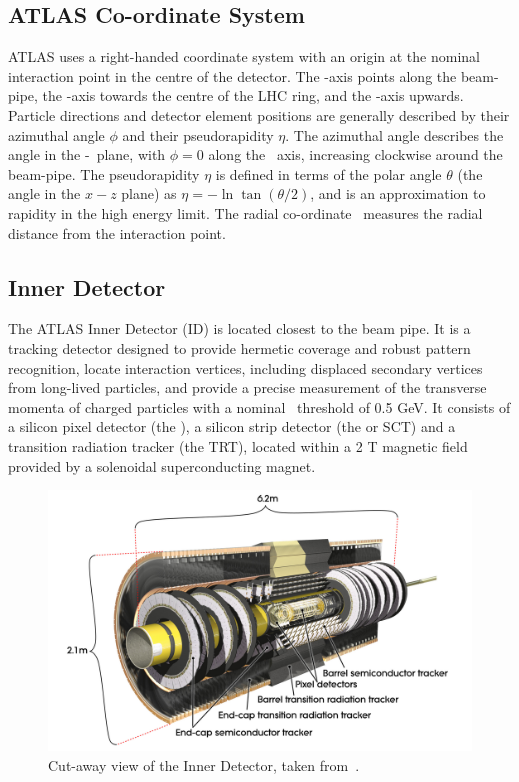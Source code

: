 \subsection{ATLAS Co-ordinate System}
ATLAS uses a right-handed coordinate system with an origin at the nominal
interaction point in the centre of the detector. The \z-axis points along the
beam-pipe, the \x-axis towards the centre of the LHC ring, and the \y-axis
upwards. Particle directions and detector element positions are generally
described by their azimuthal angle $\phi$ and their pseudorapidity $\eta$. The
azimuthal angle describes the angle in the \x-\y\ plane, with $\phi=0$ along the
\x\ axis, increasing clockwise around the beam-pipe.  The pseudorapidity $\eta$
is defined in terms of the polar angle $\theta$ (the angle in the $x-z$ plane)
as $\eta = - \ln\tan(\theta/2)$, and is an approximation to rapidity in the high
energy limit.  The radial co-ordinate \R\ measures the radial distance from the
interaction point. 

\subsection{Inner Detector}

The ATLAS Inner Detector (ID) is located closest to the beam pipe. It is a tracking
detector designed to provide hermetic coverage and robust pattern recognition, locate
interaction vertices, including displaced secondary vertices from long-lived
particles, and provide a precise measurement of the transverse momenta of charged
particles with a nominal \pt\ threshold of 0.5 GeV. It consists
of a silicon pixel detector (the ), a silicon strip
detector (the  or SCT) and a transition radiation tracker (the TRT), located within a
2 T magnetic field provided by a solenoidal superconducting magnet.

\begin{figure}[h]
\centering
\includegraphics[width=\textwidth]{ID_newTRT_d3}
\caption[Cut-away view of the Inner Detector.]{Cut-away view of the Inner Detector, taken from~\cite{Aad:1125884}.}
\label{fig:id-1}
\end{figure}


